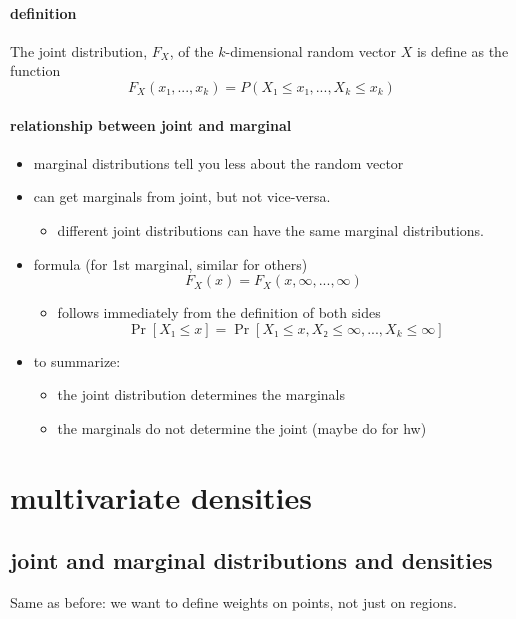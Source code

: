 \paragraph{definition}
      The joint distribution, $F_X$, of the $k$-dimensional random
      vector $X$ is define as the function 
      \[ F_X(x₁,...,x_k) = P(X₁ ≤ x₁,...,X_k ≤ x_k) \]

\paragraph{relationship between joint and marginal}
\begin{itemize}
\item marginal distributions tell you less about the random vector
\item can get marginals from joint, but not vice-versa.
\begin{itemize}
\item different joint distributions can have the same marginal
          distributions.
\end{itemize}
\item formula (for 1st marginal, similar for others)
        \[ F_X(x) = F_X(x, ∞, ...,∞) \]
\begin{itemize}
\item follows immediately from the definition of both sides
  \[ \Pr[X₁ ≤ x] = \Pr[X₁ ≤ x, X₂ ≤ ∞, ..., X_k ≤ ∞] \]
\end{itemize}
\item to summarize:
\begin{itemize}
\item the joint distribution determines the marginals
\item the marginals do not determine the joint (maybe do for hw)
\end{itemize}
\end{itemize}

\section{multivariate densities}
\subsection{joint and marginal distributions and densities}

      Same as before: we want to define weights on points, not just on
      regions.

